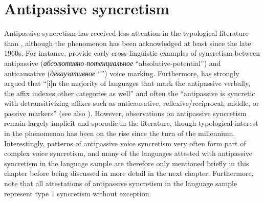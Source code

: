 \section{Antipassive syncretism} \label{sec:simple-syncretism:antipassive}
Antipassive syncretism has received less attention in the typological literature than , although the phenomenon has been acknowledged at least since the late 1960s. For instance, \cite[40ff.]{nedjalkov:silnickij:1969} provide early cross-linguistic examples of syncretism between antipassive (\textit{абсолютивно-потенциальное} “absolutive-potential”) and anticausative (\textit{декаузативное} “”) voice marking. Furthermore, \cite[314]{polinsky:2017} has strongly argued that “[i]n the majority of languages that mark the antipassive verbally, the affix indexes other categories as well” and often the “antipassive is syncretic with detransitivizing affixes such as anticausative, reflexive/reciprocal, middle, or passive markers” (see also \citealt[139]{heaton:2020}). However, observations on antipassive syncretism remain largely implicit and sporadic in the literature, though typological interest in the phenomenon has been on the rise since the turn of the millennium. Interestingly, patterns of antipassive voice syncretism very often form part of complex voice syncretism, and many of the languages attested with antipassive syncretism in the language sample are therefore only mentioned briefly in this chapter before being discussed in more detail in the next chapter. Furthermore, note that all attestations of antipassive syncretism in the language sample represent type 1 syncretism without exception.

